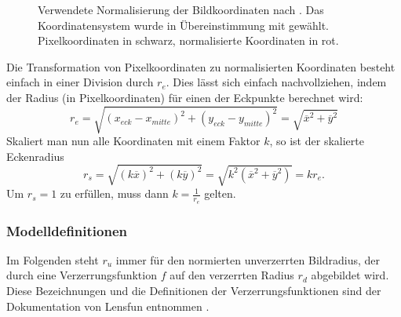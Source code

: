 \begin{figure}[h]
	\centering
	
	\caption{Verwendete Normalisierung der Bildkoordinaten nach \cite{imatest, lensfun}. Das Koordinatensystem wurde in Übereinstimmung mit \cite[S. 359]{pbrt_book} gewählt. Pixelkoordinaten in schwarz, normalisierte Koordinaten in rot.	\label{fig:normalisation}}
	\label{fig:norm}
\end{figure}

Die Transformation von Pixelkoordinaten zu normalisierten Koordinaten besteht einfach in einer Division durch $r_e$. Dies lässt sich einfach nachvollziehen, indem der Radius (in Pixelkoordinaten) für einen der Eckpunkte berechnet wird:
\begin{equation}
	r_e = \sqrt{(x_{eck} - x_{mitte})^2 + (y_{eck} - y_{mitte})^2} = \sqrt{\overline{x}^2 + \overline{y}^2}
\end{equation}
Skaliert man nun alle Koordinaten mit einem Faktor $k$, so ist der skalierte Eckenradius
\begin{equation}
	r_s = \sqrt{(k \overline{x})^2 + (k \overline{y})^2} = \sqrt{k^2 (\overline{x}^2 + \overline{y}^2)} = k r_e.
\end{equation}
Um $r_s = 1$ zu erfüllen, muss dann $k = \frac{1}{r_e}$ gelten.

\newpage
\subsubsection{Modelldefinitionen}\label{sec:Modeldefinitions}
\label{subsubsec:modeldef}

Im Folgenden steht $r_u$ immer für den normierten unverzerrten Bildradius, der durch eine Verzerrungsfunktion $f$ auf den verzerrten Radius $r_d$ abgebildet wird. Diese Bezeichnungen und die Definitionen der Verzerrungsfunktionen sind der Dokumentation von Lensfun entnommen \cite{lensfun}.

